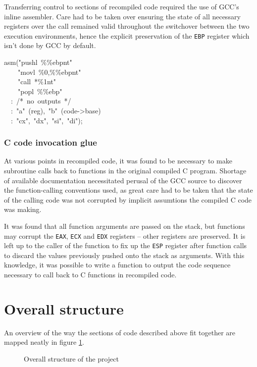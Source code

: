 Transferring control to sections of recompiled code required the use of GCC's inline assembler. Care had to be taken over ensuring the state of all necessary registers over the call remained valid throughout the switchover between the two execution environments, hence the explicit preservation of the {\tt EBP} register which isn't done by GCC by default.

\begin{code}
asm("pushl~\%\%ebp\bq n\bq t"~\bq \\
~~~~"movl~\%0,\%\%ebp\bq n\bq t"~\bq \\
~~~~"call~*\%1\bq n\bq t"~\bq \\
~~~~"popl~\%\%ebp"\\
~~:~/*~no~outputs~*/\\
~~:~"a"~(reg),~"b"~(code->base)\\
~~:~"cx",~"dx",~"si",~"di");
\end{code}

\subsubsection{C code invocation glue}

At various points in recompiled code, it was found to be necessary to make subroutine calls back to functions in the original compiled C program. Shortage of available documentation necessitated perusal of the GCC source to discover the function-calling conventions used, as great care had to be taken that the state of the calling code was not corrupted by implicit assumtions the compiled C code was making.

It was found that all function arguments are passed on the stack, but functions may corrupt the {\tt EAX}, {\tt ECX} and {\tt EDX} registers -- other registers are preserved. It is left up to the caller of the function to fix up the {\tt ESP} register after function calls to discard the values previously pushed onto the stack as arguments. With this knowledge, it was possible to write a function to output the code sequence necessary to call back to C functions in recompiled code.

\section{Overall structure}

An overview of the way the sections of code described above fit together are mapped neatly in figure \ref{structure}.

\begin{figure}[tbh]

\centerline{}

\caption{\label{structure}Overall structure of the project}
\end{figure}
